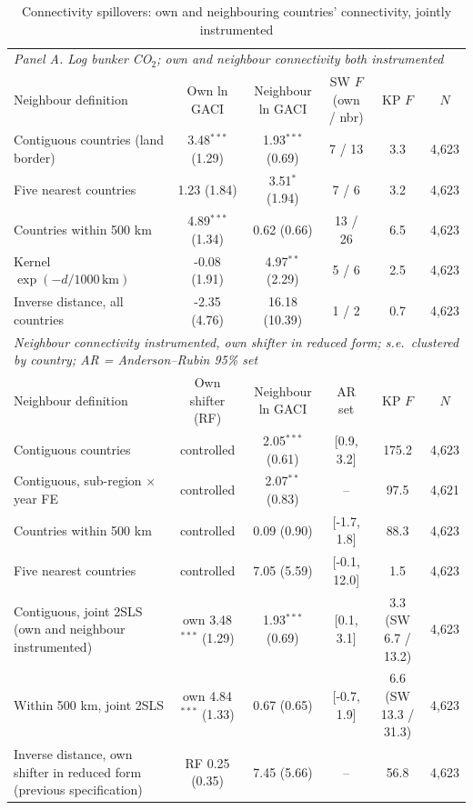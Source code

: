 \begin{table}[htbp]
\centering
\begin{threeparttable}
\caption{Connectivity spillovers: own and neighbouring countries' connectivity, jointly instrumented}
\label{tab:spillover}
\footnotesize
\begin{tabular}{lccccc}
\toprule
\multicolumn{6}{l}{\textit{Panel A. Log bunker CO$_2$; own and neighbour connectivity both instrumented}} \\
Neighbour definition & Own ln GACI & Neighbour ln GACI & SW $F$ (own / nbr) & KP $F$ & $N$ \\
\midrule
  Contiguous countries (land border) & 3.48$^{***}$ (1.29) & 1.93$^{***}$ (0.69) & 7 / 13 & 3.3 & 4,623 \\
  Five nearest countries & 1.23 (1.84) & 3.51$^{*}$ (1.94) & 7 / 6 & 3.2 & 4,623 \\
  Countries within 500 km & 4.89$^{***}$ (1.34) & 0.62 (0.66) & 13 / 26 & 6.5 & 4,623 \\
  Kernel $\exp(-d/1000\,\mathrm{km})$ & -0.08 (1.91) & 4.97$^{**}$ (2.29) & 5 / 6 & 2.5 & 4,623 \\
  Inverse distance, all countries & -2.35 (4.76) & 16.18 (10.39) & 1 / 2 & 0.7 & 4,623 \\
\midrule
\multicolumn{6}{l}{\textit{Neighbour connectivity instrumented, own shifter in reduced form; s.e.\ clustered by country; AR = Anderson--Rubin 95\% set}} \\
Neighbour definition & Own shifter (RF) & Neighbour ln GACI & AR set & KP $F$ & $N$ \\
  Contiguous countries & controlled & 2.05$^{***}$ (0.61) & [0.9, 3.2] & 175.2 & 4,623 \\
  Contiguous, sub-region $\times$ year FE & controlled & 2.07$^{**}$ (0.83) & -- & 97.5 & 4,621 \\
  Countries within 500 km & controlled & 0.09 (0.90) & [-1.7, 1.8] & 88.3 & 4,623 \\
  Five nearest countries & controlled & 7.05 (5.59) & [-0.1, 12.0] & 1.5 & 4,623 \\
  Contiguous, joint 2SLS (own and neighbour instrumented) & own 3.48$^{***}$ (1.29) & 1.93$^{***}$ (0.69) & [0.1, 3.1] & 3.3 (SW 6.7 / 13.2) & 4,623 \\
  Within 500 km, joint 2SLS & own 4.84$^{***}$ (1.33) & 0.67 (0.65) & [-0.7, 1.9] & 6.6 (SW 13.3 / 31.3) & 4,623 \\
  Inverse distance, own shifter in reduced form (previous specification) & RF 0.25 (0.35) & 7.45 (5.66) & -- & 56.8 & 4,623 \\

\end{tabular}
\end{threeparttable}
\end{table}
